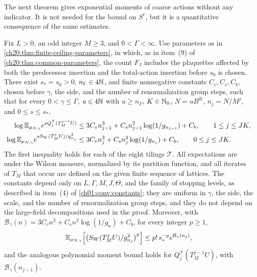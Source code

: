 The next theorem gives exponential moments of coarse actions without any indicator. It is not needed for the bound on $S^c$, but it is a quantitative consequence of the same estimates.

\begin{theorem}\label{ch20:thm:unmarked-coarse-action-moments}
Fix $L>0$, an odd integer $M\ge3$, and $0<\Gamma<\infty$. Use parameters as in \cref{ch20:thm:finite-ceiling-parameters}, in which, as in item~\textup{(9)} of \cref{ch20:thm:common-parameters}, the count $F_J$ includes the plaquettes affected by both the predecessor insertion and the total-action insertion before $s_0$ is chosen. There exist $s_*=s_0>0$, $n_\Gamma\in4\mathbb N$, and finite nonnegative constants $C_v,C_s,C_b$, chosen before $\gamma$, the side, and the number of renormalization group steps, such that for every $0<\gamma\le\Gamma$, $u\in4\mathbb N$ with $u\ge n_\Gamma$, $K\in\mathbb N_0$, $N=uB^K$, $n_j=N/M^j$, and $0\le s\le s_*$,
\begin{align}
 \log\mathbb E_{\mu_{N,\gamma}}e^{sQ_j^{\mathcal T}(T_M^{j-1}U)}
 &\le3C_vn_{j-1}^3+C_sn_{j-1}^2\log(1/g_{n_{j-1}})+C_b,\qquad 1\le j\le JK,
 \label{ch20:eq:unmarked-predecessor-moment}\\
 \log\mathbb E_{\mu_{N,\gamma}}e^{sS_W(T_M^jU)/g_{n_j}^2}
 &\le3C_vn_j^3+C_sn_j^2\log(1/g_{n_j})+C_b,\qquad 0\le j\le JK.
 \label{ch20:eq:unmarked-all-face-moment}
\end{align}
The first inequality holds for each of the eight tilings $\mathcal T$. All expectations are under the Wilson measure, normalized by its partition function, and all iterates of $T_M$ that occur are defined on the given finite sequence of lattices. The constants depend only on $L,\Gamma,M,J,\Theta$, and the family of stopping levels, as described in item~\textup{(4)} of \cref{ch01:conv:constants}; they are uniform in $\gamma$, the side, the scale, and the number of renormalization group steps, and they do not depend on the large-field decompositions used in the proof. Moreover, with $\mathcal B_\gamma(n)=3C_vn^3+C_sn^2\log(1/g_n)+C_b$, for every integer $p\ge1$,
\[
 \mathbb E_{\mu_{N,\gamma}}\Bigl[\bigl(S_W(T_M^jU)/g_{n_j}^2\bigr)^p\Bigr]\le p!\,s_*^{-p}e^{\mathcal B_\gamma(n_j)},
\]
and the analogous polynomial moment bound holds for $Q_j^{\mathcal T}(T_M^{j-1}U)$, with $\mathcal B_\gamma(n_{j-1})$.
\end{theorem}

